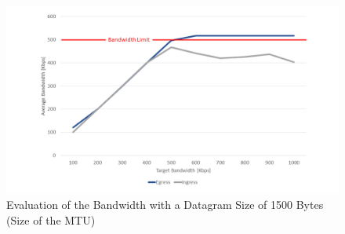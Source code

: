\begin{figure}[h]
	\centering
	\includegraphics[width=\textwidth]{img/Evaluation-Bandwidth-Small-Buffer.png}
	\caption{Evaluation of the Bandwidth with a Datagram Size of 1500 Bytes (Size of the MTU)}
	\label{Evaluation of the Bandwidth with a Datagram Size of 1500 Bytes (Size of the MTU)}
\end{figure}